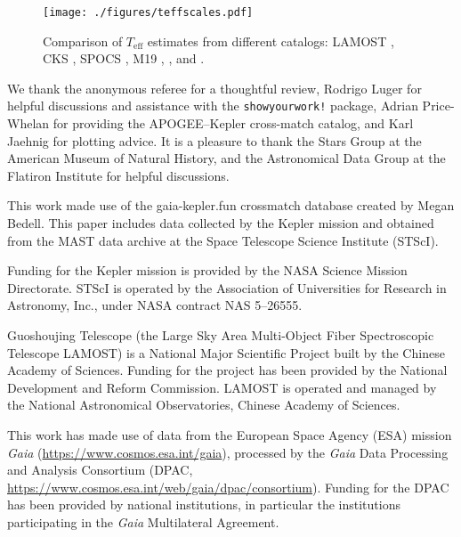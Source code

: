 \documentclass[trackchanges,twocolumn]{aastex631}
\newcommand{\teff}{\ensuremath{T_{\mathrm{eff}}}\xspace}
\begin{document}
\begin{figure}
    \centering
    \texttt{[image: ./figures/teffscales.pdf]}
    \caption{Comparison of \teff estimates from different catalogs: LAMOST \citep{Xiang2019}, CKS \citep{Fulton2018}, SPOCS \citep{Brewer2018}, M19 \citep{Martinez2019}, \citet{McQuillan2014}, and \citet{Hall2021}.}
    \label{fig:teffscales}
\end{figure}


\begin{acknowledgments}
We thank the anonymous referee for a thoughtful review, Rodrigo Luger for helpful discussions and assistance with the \texttt{showyourwork!} package, Adrian Price-Whelan for providing the APOGEE--Kepler cross-match catalog, and Karl Jaehnig for plotting advice. It is a pleasure to thank the Stars Group at the American Museum of Natural History, and the Astronomical Data Group at the Flatiron Institute for helpful discussions. 

This work made use of the gaia-kepler.fun crossmatch database created by Megan Bedell. This paper includes data collected by the Kepler mission and obtained from the MAST data archive at the Space Telescope Science Institute (STScI). 

Funding for the Kepler mission is provided by the NASA Science Mission Directorate. STScI is operated by the Association of Universities for Research in Astronomy, Inc., under NASA contract NAS 5–26555. 

Guoshoujing Telescope (the Large Sky Area Multi-Object Fiber Spectroscopic Telescope LAMOST) is a National Major Scientific Project built by the Chinese Academy of Sciences. Funding for the project has been provided by the National Development and Reform Commission. LAMOST is operated and managed by the National Astronomical Observatories, Chinese Academy of Sciences. 

This work has made use of data from the European Space Agency (ESA) mission {\it Gaia} (\url{https://www.cosmos.esa.int/gaia}), processed by the {\it Gaia} Data Processing and Analysis Consortium (DPAC, \url{https://www.cosmos.esa.int/web/gaia/dpac/consortium}). Funding for the DPAC has been provided by national institutions, in particular the institutions participating in the {\it Gaia} Multilateral Agreement. 


\end{acknowledgments}
\end{document}
